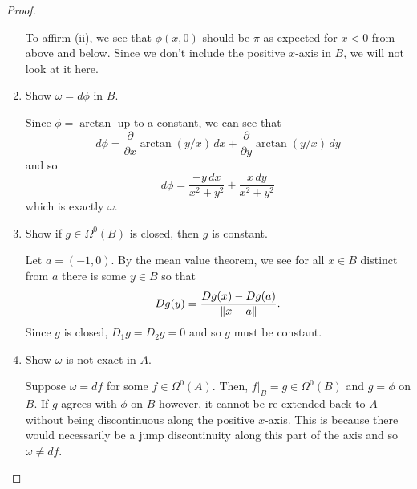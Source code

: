 \documentclass{article}
\begin{document}
\begin{proof}
\begin{enumerate}[start=1,label={(\alph*)}]
        To affirm (ii), we see that $\phi(x, 0)$ should be $\pi$ as expected for $x < 0$
        from above and below.
        Since we don't include the positive $x$-axis in $B$, we will not look at it here.

  \item Show $\omega = d\phi$ in $B$.

        Since $\phi = \arctan$ up to a constant, we can see that
        \[ d\phi = \frac{\partial}{\partial x}\arctan(y/x)\, dx + \frac{\partial}{\partial y}\arctan(y/x) \, dy \]
        and so
        \[ d\phi = \frac{-y \, dx}{x^{2} + y^{2}} + \frac{x \, dy}{x^{2} + y^{2}} \]
        which is exactly $\omega$.

  \item Show if $g \in \Omega^{0}(B)$ is closed, then $g$ is constant.

        Let $a = (-1, 0)$. By the mean value theorem, we see for all $x \in B$ distinct from $a$
        there is some $y \in B$ so that
        \[ Dg(y) = \frac{Dg(x) - Dg(a)}{\lVert x - a\rVert}. \]
        Since $g$ is closed, $D_{1}g = D_{2}g = 0$ and so $g$ must be constant.

  \item Show $\omega$ is not exact in $A$.

        Suppose $\omega = df$ for some $f \in \Omega^{0}(A)$.
        Then, $f|_{B} = g \in \Omega^{0}(B)$ and $g = \phi$ on $B$.
        If $g$ agrees with $\phi$ on $B$ however, it cannot be re-extended back to $A$ without
        being discontinuous along the positive $x$-axis. This is because there would necessarily
        be a jump discontinuity along this part of the axis and so $\omega \ne df$.
\end{enumerate}

\end{proof}
\end{document}
